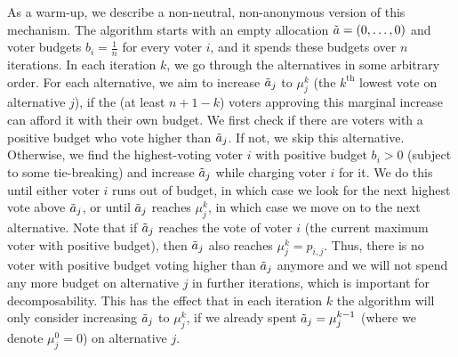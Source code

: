 \documentclass[11pt]{article}
\begin{document}
As a warm-up, we describe a non-neutral, non-anonymous version of this mechanism. The algorithm starts with an empty allocation $\Tilde{a} = (0, \dots, 0)$ and voter budgets $b_i = \frac{1}{n}$ for every voter $i$, and it spends these budgets over $n$ iterations. In each iteration $k$, we go through the alternatives in some arbitrary order. For each alternative, we aim to increase $\Tilde{a}_j$ to $\mu^k_j$ (the $k^{\text{th}}$ lowest vote on alternative $j$), if the (at least $n+1-k$) voters approving this marginal increase can afford it with their own budget.
We first check if there are voters with a positive budget who vote higher than $\Tilde{a}_j$. If not, we skip this alternative. Otherwise, we find the highest-voting voter $i$ with positive budget $b_i > 0$ (subject to some tie-breaking) and increase $\Tilde{a}_j$ while charging voter $i$ for it. We do this until either voter $i$ runs out of budget, in which case we look for the next highest vote above $\Tilde{a}_j$, or until $\Tilde{a}_j$ reaches $\mu^k_j$, in which case we move on to the next alternative. 
Note that if $\Tilde{a}_j$ reaches the vote of voter $i$ (the current maximum voter with positive budget), then $\Tilde{a}_j$ also reaches $\mu^k_j = p_{i,j}$. Thus, there is no voter with positive budget voting higher than $\Tilde{a}_j$ anymore and we will not spend any more budget on alternative $j$ in further iterations, which is important for decomposability. This has the effect that in each iteration $k$ the algorithm will only consider increasing $\Tilde{a}_j$ to $\mu^k_j$, if we already spent $\Tilde{a}_j = \mu^{k-1}_j$ (where we denote $\mu^0_j = 0$) on alternative $j$.
\end{document}

